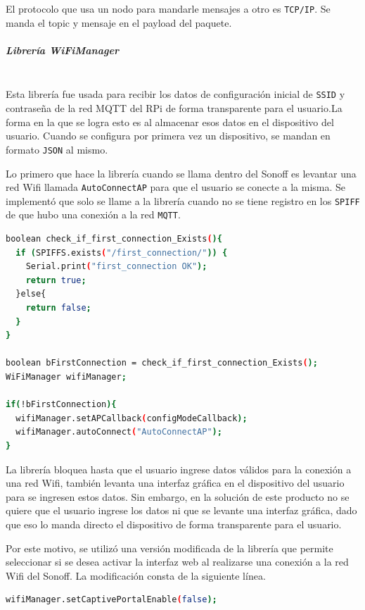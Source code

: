 El protocolo que usa un nodo para mandarle mensajes a otro es \lstinline[columns=fixed]{TCP/IP}. Se manda el topic y mensaje en el payload del paquete.~

\subparagraph{Librería WiFiManager}\mbox{}\\
Esta librería fue usada para recibir los datos de configuración inicial de \lstinline[columns=fixed]{SSID} y contraseña de la red MQTT del RPi de forma transparente para el usuario.La forma en la que se logra esto es al almacenar esos datos en el dispositivo del usuario. Cuando se configura por primera vez un dispositivo, se mandan en formato \lstinline[columns=fixed]{JSON} al mismo. 

Lo primero que hace la librería cuando se llama dentro del Sonoff es levantar una red Wifi llamada \lstinline[columns=fixed]{AutoConnectAP} para que el usuario se conecte a la misma. Se implementó que solo se llame a la librería cuando no se tiene registro en los \lstinline[columns=fixed]{SPIFF} de que hubo una conexión a la red \lstinline[columns=fixed]{MQTT}.

\begin{lstlisting}[language=bash]
boolean check_if_first_connection_Exists(){
  if (SPIFFS.exists("/first_connection/")) {
    Serial.print("first_connection OK");
    return true;
  }else{
    return false;
  }
}

boolean bFirstConnection = check_if_first_connection_Exists();
WiFiManager wifiManager;

if(!bFirstConnection){
  wifiManager.setAPCallback(configModeCallback);
  wifiManager.autoConnect("AutoConnectAP");
}
\end{lstlisting}

La librería bloquea hasta que el usuario ingrese datos válidos para la conexión a una red Wifi, también levanta una interfaz gráfica en el dispositivo del usuario para se ingresen estos datos. Sin embargo, en la solución de este producto no se quiere que el usuario ingrese los datos ni que se levante una interfaz gráfica, dado que eso lo manda directo el dispositivo de forma transparente para el usuario.

Por este motivo, se utilizó una versión modificada de la librería que permite seleccionar si se desea activar la interfaz web al realizarse una conexión a la red Wifi del Sonoff. La modificación consta de la siguiente línea.

\begin{lstlisting}[language=bash]
wifiManager.setCaptivePortalEnable(false);
\end{lstlisting}

